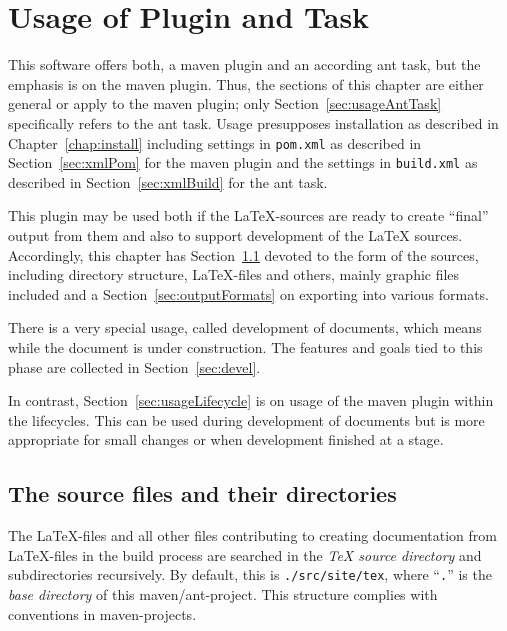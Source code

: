 
\chapter{Usage of Plugin and Task}\label{chap:usage}

This software offers both, a maven plugin and an according ant task,
but the emphasis is on the maven plugin.
Thus, the sections of this chapter are either general
or apply to the maven plugin;
only Section~\ref{sec:usageAntTask} specifically refers to the ant task. 
Usage presupposes installation as described in Chapter~\ref{chap:install}
including settings in \texttt{pom.xml} 
as described in Section~\ref{sec:xmlPom} for the maven plugin 
and the settings in \texttt{build.xml} 
as described in Section~\ref{sec:xmlBuild} for the ant task.

This plugin may be used both if the \LaTeX-sources are ready 
to create ``final'' output from them 
and also to support development of the \LaTeX{} sources. 
Accordingly, this chapter has Section~\ref{sec:sources}
devoted to the form of the sources, including directory structure,
\LaTeX-files and others, mainly graphic files included
and a Section~\ref{sec:outputFormats} on exporting into various formats.

There is a very special usage, called development of documents,
which means while the document is under construction.
The features and goals tied to this phase
are collected in Section~\ref{sec:devel}.

In contrast, Section~\ref{sec:usageLifecycle}
is on usage of the maven plugin within the lifecycles.
This can be used during development of documents
but is more appropriate for small changes
or when development finished at a stage. 


\section{The source files and their directories}\label{sec:sources}

The \LaTeX-files and all other files contributing to creating documentation 
from \LaTeX-files in the build process 
are searched in the \emph{\TeX{} source directory} and subdirectories recursively. 
By default, this is \texttt{./src/site/tex}, 
where ``\texttt{.}'' is the \emph{base directory} of this maven/ant-project. 
This structure complies with conventions in maven-projects. 

